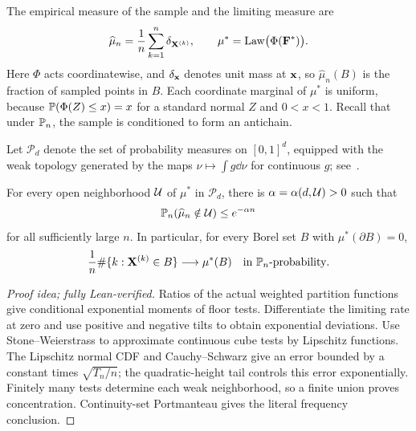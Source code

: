 \documentclass[11pt,letterpaper]{article}
\begin{document}
The empirical measure of the sample and the limiting measure are
\begin{equation}\label{eq:mu_n_hat_definition}
      \widehat\mu_n=\frac1n\sum_{k=1}^n\delta_{\vX^{(k)}}, \qquad \mu^\ast=\law\bigl(\Phi(\vF^\ast)\bigr).
\end{equation}
Here $\Phi$ acts coordinatewise, and $\delta_{\vx}$ denotes unit mass at $\vx$, so $\widehat\mu_n(B)$ is the fraction of sampled points in $B$.
Each coordinate marginal of $\mu^\ast$ is uniform, because $\P(\Phi(Z)\le x)=x$ for a standard normal $Z$ and $0<x<1$. Recall that under $\P_n$, the sample is conditioned to form an antichain.

Let $\mathcal P_d$ denote the set of probability measures on $[0,1]^d$, equipped with the weak topology generated by the maps $\nu\mapsto\int g\dd\nu$ for continuous $g$; see~\cite[Chapter~1]{Billingsley}.


\begin{theorem}
      \label{prop:empirical-limit}\label{thm:empirical-limit}\label{thm:distribution}
      For every open neighborhood $\cU$ of $\mu^\ast$ in $\mathcal P_d$, there is $\alpha=\alpha(d,\cU)>0$ such that
      \begin{equation}\label{eq:empirical}
            \P_n(\widehat\mu_n\notin\cU)\le e^{-\alpha n}
      \end{equation}
      for all sufficiently large $n$. In particular, for every Borel set $B$ with $\mu^\ast(\partial B)=0$,
      \[
            \frac1n\#\{k:\vX^{(k)}\in B\}\longrightarrow\mu^\ast(B)
            \quad\text{in }\P_n\text{-probability}.
      \]
\end{theorem}

\begin{proof}[Proof idea; fully Lean-verified]
Ratios of the actual weighted partition functions give conditional exponential moments of floor tests. Differentiate the limiting rate at zero and use positive and negative tilts to obtain exponential deviations. Use Stone--Weierstrass to approximate continuous cube tests by Lipschitz functions. The Lipschitz normal CDF and Cauchy--Schwarz give an error bounded by a constant times $\sqrt{T_n/n}$; the quadratic-height tail controls this error exponentially. Finitely many tests determine each weak neighborhood, so a finite union proves concentration. Continuity-set Portmanteau gives the literal frequency conclusion.
\end{proof}
\end{document}

